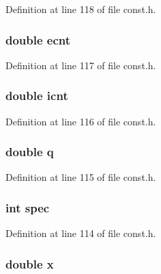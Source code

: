 Definition at line 118 of file const.\+h.

\hypertarget{structd__particle_a7e8b5e70f50ad3c740d069f4e9e658a9}{}
\subsubsection[{ecnt}]{\setlength{\rightskip}{0pt plus 5cm}double ecnt}\label{structd__particle_a7e8b5e70f50ad3c740d069f4e9e658a9}


Definition at line 117 of file const.\+h.

\hypertarget{structd__particle_aa2372309226aad25e93f477929fa8ff1}{}
\subsubsection[{icnt}]{\setlength{\rightskip}{0pt plus 5cm}double icnt}\label{structd__particle_aa2372309226aad25e93f477929fa8ff1}


Definition at line 116 of file const.\+h.

\hypertarget{structd__particle_a5b5e3f03e443adea974601f295136638}{}
\subsubsection[{q}]{\setlength{\rightskip}{0pt plus 5cm}double q}\label{structd__particle_a5b5e3f03e443adea974601f295136638}


Definition at line 115 of file const.\+h.

\hypertarget{structd__particle_ad0a8d17b47e34dc1972f90ce3ed67780}{}
\subsubsection[{spec}]{\setlength{\rightskip}{0pt plus 5cm}int spec}\label{structd__particle_ad0a8d17b47e34dc1972f90ce3ed67780}


Definition at line 114 of file const.\+h.

\hypertarget{structd__particle_af88b946fb90d5f08b5fb740c70e98c10}{}
\subsubsection[{x}]{\setlength{\rightskip}{0pt plus 5cm}double x}\label{structd__particle_af88b946fb90d5f08b5fb740c70e98c10}


